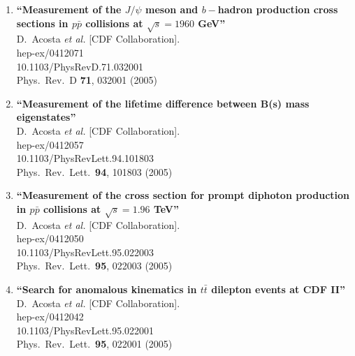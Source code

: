 \documentclass{article}
\begin{document}
\begin{enumerate}
\item%
{\bf ``Measurement of the $J/\psi$ meson and $b-$hadron production cross sections in $p\bar{p}$ collisions at $\sqrt{s} = 1960$ GeV''}
  \\{}D.~Acosta {\it et al.}  [CDF Collaboration].
  \\{}hep-ex/0412071
    \\{}10.1103/PhysRevD.71.032001
\\{}Phys.\ Rev.\ D {\bf 71}, 032001 (2005) %


\item%
{\bf ``Measurement of the lifetime difference between B(s) mass eigenstates''}
  \\{}D.~Acosta {\it et al.}  [CDF Collaboration].
  \\{}hep-ex/0412057
    \\{}10.1103/PhysRevLett.94.101803
\\{}Phys.\ Rev.\ Lett.\  {\bf 94}, 101803 (2005) %


\item%
{\bf ``Measurement of the cross section for prompt diphoton production in $p\bar{p}$ collisions at $\sqrt{s} = 1.96$ TeV''}
  \\{}D.~Acosta {\it et al.}  [CDF Collaboration].
  \\{}hep-ex/0412050
    \\{}10.1103/PhysRevLett.95.022003
\\{}Phys.\ Rev.\ Lett.\  {\bf 95}, 022003 (2005) %


\item%
{\bf ``Search for anomalous kinematics in $t\bar{t}$ dilepton events at {CDF} II''}
  \\{}D.~Acosta {\it et al.}  [CDF Collaboration].
  \\{}hep-ex/0412042
    \\{}10.1103/PhysRevLett.95.022001
\\{}Phys.\ Rev.\ Lett.\  {\bf 95}, 022001 (2005) %



\end{enumerate}
\end{document}
